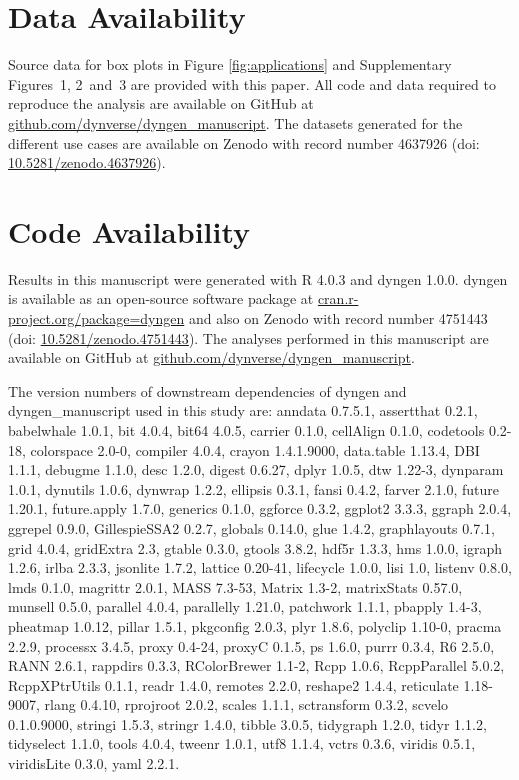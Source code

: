 \documentclass[
  table,
  10pt,
  a4paper]{article}
\begin{document}
\hypertarget{data-availability}{%
\section{Data Availability}\label{data-availability}}

Source data for box plots in Figure \ref{fig:applications} and
Supplementary Figures~1, 2~and~3 are provided with this paper. All code
and data required to reproduce the analysis are available on GitHub at
\href{https://github.com/dynverse/dyngen_manuscript}{github.com/dynverse/dyngen\_manuscript}.
The datasets generated for the different use cases are available on
Zenodo with record number 4637926 (doi:
\href{https://doi.org/10.5281/zenodo.4637926}{10.5281/zenodo.4637926}).

\hypertarget{code-availability}{%
\section{Code Availability}\label{code-availability}}

Results in this manuscript were generated with R 4.0.3 and dyngen 1.0.0.
dyngen is available as an open-source software package at
\href{https://cran.r-project.org/package=dyngen}{cran.r-project.org/package=dyngen}
and also on Zenodo with record number 4751443 (doi:
\href{https://doi.org/10.5281/zenodo.4751443}{10.5281/zenodo.4751443}).
The analyses performed in this manuscript are available on GitHub at
\href{https://github.com/dynverse/dyngen_manuscript}{github.com/dynverse/dyngen\_manuscript}.

The version numbers of downstream dependencies of dyngen and
dyngen\_manuscript used in this study are: anndata 0.7.5.1, assertthat
0.2.1, babelwhale 1.0.1, bit 4.0.4, bit64 4.0.5, carrier 0.1.0,
cellAlign 0.1.0, codetools 0.2-18, colorspace 2.0-0, compiler 4.0.4,
crayon 1.4.1.9000, data.table 1.13.4, DBI 1.1.1, debugme 1.1.0, desc
1.2.0, digest 0.6.27, dplyr 1.0.5, dtw 1.22-3, dynparam 1.0.1, dynutils
1.0.6, dynwrap 1.2.2, ellipsis 0.3.1, fansi 0.4.2, farver 2.1.0, future
1.20.1, future.apply 1.7.0, generics 0.1.0, ggforce 0.3.2, ggplot2
3.3.3, ggraph 2.0.4, ggrepel 0.9.0, GillespieSSA2 0.2.7, globals 0.14.0,
glue 1.4.2, graphlayouts 0.7.1, grid 4.0.4, gridExtra 2.3, gtable 0.3.0,
gtools 3.8.2, hdf5r 1.3.3, hms 1.0.0, igraph 1.2.6, irlba 2.3.3,
jsonlite 1.7.2, lattice 0.20-41, lifecycle 1.0.0, lisi 1.0, listenv
0.8.0, lmds 0.1.0, magrittr 2.0.1, MASS 7.3-53, Matrix 1.3-2,
matrixStats 0.57.0, munsell 0.5.0, parallel 4.0.4, parallelly 1.21.0,
patchwork 1.1.1, pbapply 1.4-3, pheatmap 1.0.12, pillar 1.5.1, pkgconfig
2.0.3, plyr 1.8.6, polyclip 1.10-0, pracma 2.2.9, processx 3.4.5, proxy
0.4-24, proxyC 0.1.5, ps 1.6.0, purrr 0.3.4, R6 2.5.0, RANN 2.6.1,
rappdirs 0.3.3, RColorBrewer 1.1-2, Rcpp 1.0.6, RcppParallel 5.0.2,
RcppXPtrUtils 0.1.1, readr 1.4.0, remotes 2.2.0, reshape2 1.4.4,
reticulate 1.18-9007, rlang 0.4.10, rprojroot 2.0.2, scales 1.1.1,
sctransform 0.3.2, scvelo 0.1.0.9000, stringi 1.5.3, stringr 1.4.0,
tibble 3.0.5, tidygraph 1.2.0, tidyr 1.1.2, tidyselect 1.1.0, tools
4.0.4, tweenr 1.0.1, utf8 1.1.4, vctrs 0.3.6, viridis 0.5.1, viridisLite
0.3.0, yaml 2.2.1.
\end{document}

